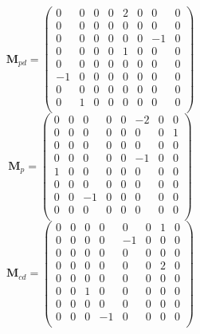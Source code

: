 \documentclass[aps, pra, reprint, amsmath, amssymb, groupedaddress, acknowledgments]{revtex4-1}
\begin{document}
\begin{equation}
\mathbf{M}_{pd}=
\left(
\begin{array}{cccccccc}
 0 & 0 & 0 & 0 & 2 & 0 & 0 & 0 \\
 0 & 0 & 0 & 0 & 0 & 0 & 0 & 0 \\
 0 & 0 & 0 & 0 & 0 & 0 & -1 & 0 \\
 0 & 0 & 0 & 0 & 1 & 0 & 0 & 0 \\
 0 & 0 & 0 & 0 & 0 & 0 & 0 & 0 \\
 -1 & 0 & 0 & 0 & 0 & 0 & 0 & 0 \\
 0 & 0 & 0 & 0 & 0 & 0 & 0 & 0 \\
 0 & 1 & 0 & 0 & 0 & 0 & 0 & 0 \\
\end{array}
\right)
\end{equation}
\begin{equation}
\mathbf{M}_{p}=
\left(
\begin{array}{cccccccc}
 0 & 0 & 0 & 0 & 0 & -2 & 0 & 0 \\
 0 & 0 & 0 & 0 & 0 & 0 & 0 & 1 \\
 0 & 0 & 0 & 0 & 0 & 0 & 0 & 0 \\
 0 & 0 & 0 & 0 & 0 & -1 & 0 & 0 \\
 1 & 0 & 0 & 0 & 0 & 0 & 0 & 0 \\
 0 & 0 & 0 & 0 & 0 & 0 & 0 & 0 \\
 0 & 0 & -1 & 0 & 0 & 0 & 0 & 0 \\
 0 & 0 & 0 & 0 & 0 & 0 & 0 & 0 \\
\end{array}
\right)
\end{equation}
\begin{equation}
\mathbf{M}_{cd}= 
\left(
\begin{array}{cccccccc}
 0 & 0 & 0 & 0 & 0 & 0 & 1 & 0 \\
 0 & 0 & 0 & 0 & -1 & 0 & 0 & 0 \\
 0 & 0 & 0 & 0 & 0 & 0 & 0 & 0 \\
 0 & 0 & 0 & 0 & 0 & 0 & 2 & 0 \\
 0 & 0 & 0 & 0 & 0 & 0 & 0 & 0 \\
 0 & 0 & 1 & 0 & 0 & 0 & 0 & 0 \\
 0 & 0 & 0 & 0 & 0 & 0 & 0 & 0 \\
 0 & 0 & 0 & -1 & 0 & 0 & 0 & 0 \\
\end{array}
\right)
\end{equation}
\end{document}
